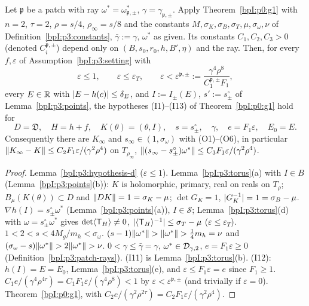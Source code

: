 \begin{lemma}\label{bpI:p3:apply}
Let $\mathfrak p$ be a patch with ray $\omega^*=\omega^*_{\mathfrak p,\pm}$, $\gamma=\gamma_{\mathfrak p,\pm}$. Apply Theorem~\ref{bpI:p0:g1} with $n=2$, $\tau=2$, $\rho=s/4$, $\rho_\infty=s/8$ and the constants $M,\sigma_K,\sigma_B,\sigma_T,\mu,\sigma_\omega,\nu$ of
Definition~\ref{bpI:p3:constants}, $\bar\gamma:=\gamma$, $\omega^*$ as given. Its constants $C_1,C_2,C_3>0$ (denoted $C_i^{\mathfrak p,\pm}$) depend only on $(B,s_0,r_0,h,B',\eta)$ and the ray.
Then, for every $f,\varepsilon$ of Assumption~\ref{bpI:p3:setting} with
\[
\varepsilon\le1,\qquad\varepsilon\le\varepsilon_T,\qquad \varepsilon<\varepsilon^{\mathfrak p,\pm}:=\frac{\gamma^4\rho^{8}}{C_1^{\mathfrak p,\pm}F_1},
\]
every $E\in\mathbb{R}$ with $\lvert E-h(c)\rvert\le\delta_E$, and $I:=I_\pm(E)$, $s':=s^\circ_\pm$ of Lemma~\ref{bpI:p3:points}, the hypotheses (I1)--(I13) of Theorem~\ref{bpI:p0:g1} hold for
\[
D=\mathfrak D,\quad H=h+f,\quad K(\theta)=(\theta,I),\quad s=s^\circ_\pm,\quad\gamma,\quad e=F_1\varepsilon,\quad E_0=E.
\]
Consequently there are $K_\infty$ and $s_\infty\in(1,\sigma_\omega)$ with (O1)--(O6), in particular
$\lVert K_\infty-K\rVert\le C_2F_1\varepsilon/(\gamma^2\rho^4)$ on $T_{\rho_\infty}$, $\lVert (s_\infty-s^\circ_\pm)\omega^*\rVert\le C_3F_1\varepsilon/(\gamma^2\rho^4)$.
\end{lemma}
\begin{proof}
\label{stepI:p3:ap-d}
Lemma~\ref{bpI:p3:hypothesis-d} ($\varepsilon\le1$).
\label{stepI:p3:ap-k}
Lemma~\ref{bpI:p3:torus}(a) with $I\in B$ (Lemma~\ref{bpI:p3:points}(b)): $K$ is holomorphic, primary, real on reals on $T_\rho$; $B_\mu(K(\theta))\subset D$ and $\lVert DK\rVert=1=\sigma_K-\mu$; $\det G_K=1$, $\lvert G_K^{-1}\rvert=1=\sigma_B-\mu$.
\label{stepI:p3:ap-t}
$\nabla h(I)=s^\circ_\pm\omega^*$ (Lemma~\ref{bpI:p3:points}(a)), $I\in\mathcal S$; Lemma~\ref{bpI:p3:torus}(d) with $\omega=s^\circ_\pm\omega^*$ gives $\det\langle \mathsf T_H\rangle\ne0$, $\lvert \langle \mathsf T_H\rangle^{-1}\rvert\le\sigma_T-\mu$ ($\varepsilon\le\varepsilon_T$).
\label{stepI:p3:ap-ray}
$1<2<s<4M_g/m_h<\sigma_\omega$. $(s-1)\lVert \omega^*\rVert>\lVert \omega^*\rVert>\tfrac14m_h=\nu$ and $(\sigma_\omega-s)\lVert \omega^*\rVert>2\lVert \omega^*\rVert>\nu$.
\label{stepI:p3:ap-error}
$0<\gamma\le\bar\gamma=\gamma$, $\omega^*\in\mathcal{D}_{\gamma,2}$, $e=F_1\varepsilon\ge0$ (Definition~\ref{bpI:p3:patch-rays}). (I11) is Lemma~\ref{bpI:p3:torus}(b). (I12): $h(I)=E=E_0$, Lemma~\ref{bpI:p3:torus}(e), and $\varepsilon\le F_1\varepsilon=e$ since $F_1\ge1$.
\label{stepI:p3:ap-small}
$C_1e/(\gamma^4\rho^{4\tau})=C_1F_1\varepsilon/(\gamma^4\rho^8)<1$ by $\varepsilon<\varepsilon^{\mathfrak p,\pm}$ (and trivially if $\varepsilon=0$).
\label{stepI:p3:ap-conclusion}
Theorem~\ref{bpI:p0:g1}, with $C_2e/(\gamma^2\rho^{2\tau})=C_2F_1\varepsilon/(\gamma^2\rho^4)$.
\end{proof}

